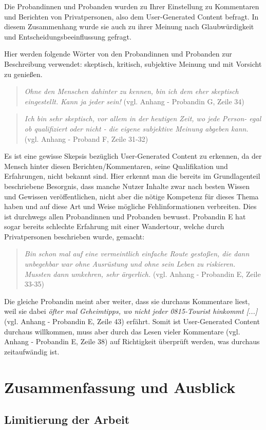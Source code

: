 Die Probandinnen und Probanden wurden zu Ihrer Einstellung zu Kommentaren und Berichten von Privatpersonen, also dem User-Generated Content befragt. In diesem Zusammenhang wurde sie auch zu ihrer Meinung nach Glaubwürdigkeit und Entscheidungsbeeinflussung gefragt.

Hier werden folgende Wörter von den Probandinnen und Probanden zur Beschreibung verwendet: skeptisch, kritisch, subjektive Meinung und mit Vorsicht zu genießen.

\begin{quote}
	\textit{\glqq Ohne den Menschen dahinter zu kennen, bin ich dem eher skeptisch eingestellt. Kann ja jeder sein!\grqq} (vgl. Anhang - Probandin G, Zeile 34)
\end{quote}

\begin{quote}
	\textit{\glqq Ich bin sehr skeptisch, vor allem in der heutigen Zeit, wo jede Person- egal ob qualifiziert oder nicht - die eigene subjektive Meinung abgeben kann.\grqq} (vgl. Anhang - Proband F, Zeile 31-32)
\end{quote}

Es ist eine gewisse Skepsis bezüglich User-Generated Content zu erkennen, da der Mensch hinter diesen Berichten/Kommentaren, seine Qualifikation und Erfahrungen, nicht bekannt sind. Hier erkennt man die bereits im Grundlagenteil beschriebene Besorgnis, dass manche Nutzer Inhalte zwar nach besten Wissen und Gewissen veröffentlichen, nicht aber die nötige Kompetenz für dieses Thema haben und auf diese Art und Weise mögliche Fehlinformationen verbreiten. Dies ist durchwegs allen Probandinnen und Probanden bewusst. Probandin E hat sogar bereits schlechte Erfahrung mit einer Wandertour, welche durch Privatpersonen beschrieben wurde, gemacht:

\begin{quote}
	\textit{\glqq Bin schon mal auf eine vermeintlich einfache Route gestoßen, die dann unbegehbar war ohne Ausrüstung und ohne sein Leben zu riskieren. Mussten dann umkehren, sehr ärgerlich.\grqq} (vgl. Anhang - Probandin E, Zeile 33-35)
\end{quote}

Die gleiche Probandin meint aber weiter, dass sie durchaus Kommentare liest, weil sie dabei \textit{\glqq [...] öfter mal Geheimtipps, wo nicht jeder 0815-Tourist hinkommt [...]}\grqq (vgl. Anhang - Probandin E, Zeile 43) erfährt. Somit ist User-Generated Content durchaus willkommen, muss aber durch das Lesen vieler Kommentare (vgl. Anhang - Probandin E, Zeile 38) auf Richtigkeit überprüft werden, was durchaus zeitaufwändig ist.








\chapter{Zusammenfassung und Ausblick}


\section{Limitierung der Arbeit}









